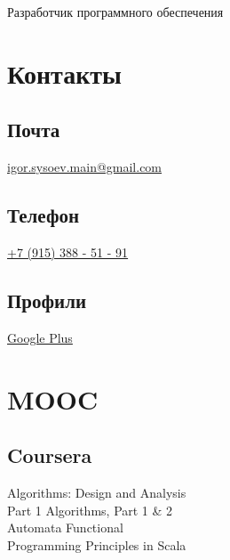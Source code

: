 \documentclass[a4paper]{curricula-vitae}
\begin{document}


{Разработчик программного обеспечения}

\begin{minipage}[t]{0.33\textwidth} %

\section{Контакты} 

\subsection{Почта}
\href{mailto:igor.sysoev.main@gmail.com}{igor.sysoev.main@gmail.com}

\insertspace

\subsection{Телефон}
\href{tel:+79153885191}{+7 (915) 388 - 51 - 91}

\insertspace

\subsection{Профили}
\href{https://plus.google.com/+%D0%98%D0%B3%D0%BE%D1%80%D1%8C%D0%A1%D1%8B%D1%81%D0%BE%D0%B5%D0%B2}{Google Plus}

\insertspace

\section{MOOC}

\subsection{Coursera}
Algorithms: Design and Analysis \\
Part 1 \textbullet{} Algorithms, Part 1 \& 2 \\ 
Automata \textbullet{} Functional \\
Programming Principles in Scala


\end{minipage}
\end{document}
